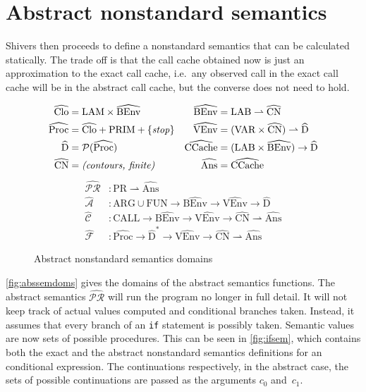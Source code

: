 \documentclass[a4paper,parskip=half,BCOR=8mm,DIV=calc,12pt]{scrbook}
\newcommand{\aC}{\widehat{\mathcal C}}
\newcommand{\aF}{\widehat{\mathcal F}}
\newcommand{\aPR}{\widehat{\mathcal {PR}}}
\newcommand{\aA}{\widehat{\mathcal A}}
\begin{document}
\section{Abstract nonstandard semantics}

Shivers then proceeds to define a nonstandard semantics that can be calculated statically. The trade off is that the call cache obtained now is just an approximation to the exact call cache, i.e.\ any observed call in the exact call cache will be in the abstract call cache, but the converse does not need to hold.

\begin{figure}
\setlength{\FrameSep}{0pt}
\begin{framed}
\begin{align*}
\widehat{\text{Clo}} &= \text{LAM} \times \widehat{\text{BEnv}}
& \widehat{\text{BEnv}} &= \text{LAB} \rightharpoonup \widehat{\text{CN}} \\
\widehat{\text{Proc}} &= \widehat{\text{Clo}} + \text{PRIM} + \{\text{\textit{stop}}\} 
& \widehat{\text{VEnv}} &= (\text{VAR}\times \widehat{\text{CN}}) \rightharpoonup \widehat{\text{D}} \\
\widehat{\text{D}} &= \mathcal P(\widehat{\text{Proc}})
& \widehat{\text{CCache}} &= (\text{LAB} \times \widehat{\text{BEnv}}) \to \widehat{\text{D}} \\
\widehat{\text{CN}} &= \text{\textit{(contours, finite)}} 
& \widehat{\text{Ans}} &= \widehat{\text{CCache}}
\end{align*}
\begin{align*}
\aPR &\colon \text{PR} \rightharpoonup \widehat{\text{Ans}} \\
\aA &\colon \text{ARG}\cup\text{FUN} \to \widehat{\text{BEnv}} \to \widehat{\text{VEnv}} \to \widehat{\text{D}} \\
\aC &\colon \text{CALL}\to \widehat{\text{BEnv}} \to \widehat{\text{VEnv}} \to \widehat{\text{CN}} \rightharpoonup \widehat{\text{Ans}} \\
\aF &\colon \widehat{\text{Proc}}\to \widehat{\text{D}}^* \to \widehat{\text{VEnv}} \to \widehat{\text{CN}} \rightharpoonup \widehat{\text{Ans}}
\end{align*}
\end{framed}
\caption{Abstract nonstandard semantics domains}
\label{fig:abssemdoms}
\end{figure}

\vref{fig:abssemdoms} gives the domains of the abstract semantics functions. The abstract semantics $\aPR$ will run the program no longer in full detail. It will not keep track of actual values computed and conditional branches taken. Instead, it assumes that every branch of an \texttt{if} statement is possibly taken. Semantic values are now sets of possible procedures. This can be seen in \vref{fig:ifsem}, which contains both the exact and the abstract nonstandard semantics definitions for an conditional expression. The continuations respectively, in the abstract case, the sets of possible continuations are passed as the arguments $c_0$ and~$c_1$.
\end{document}

